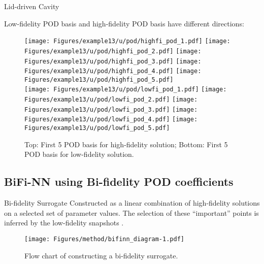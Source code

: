 \documentclass[10pt]{beamer}
\begin{document}
\begin{frame}{Lid-driven Cavity}

Low-fidelity POD basis and high-fidelity POD basis have different directions:

\begin{figure}
\centering
\vbox{
	\texttt{[image: Figures/example13/u/pod/highfi\_pod\_1.pdf]}
	\texttt{[image: Figures/example13/u/pod/highfi\_pod\_2.pdf]}
	\texttt{[image: Figures/example13/u/pod/highfi\_pod\_3.pdf]}
	\texttt{[image: Figures/example13/u/pod/highfi\_pod\_4.pdf]}
	\texttt{[image: Figures/example13/u/pod/highfi\_pod\_5.pdf]}
	\\
	\texttt{[image: Figures/example13/u/pod/lowfi\_pod\_1.pdf]}
	\texttt{[image: Figures/example13/u/pod/lowfi\_pod\_2.pdf]}
	\texttt{[image: Figures/example13/u/pod/lowfi\_pod\_3.pdf]}
	\texttt{[image: Figures/example13/u/pod/lowfi\_pod\_4.pdf]}
	\texttt{[image: Figures/example13/u/pod/lowfi\_pod\_5.pdf]}
}
\caption{Top: First 5 POD basis for high-fidelity solution; Bottom: First 5 POD basis for low-fidelity solution.}
\end{figure}

\end{frame}

\subsection{BiFi-NN using Bi-fidelity POD coefficients}

\begin{frame}{Bi-fidelity Surrogate}
Constructed as a linear combination of high-fidelity solutions on a selected set of parameter values. The selection of these ``important'' points is inferred by the low-fidelity snapshots \cite{zhu2014computational}.

\begin{figure}
\centering
\texttt{[image: Figures/method/bifinn\_diagram-1.pdf]}
\caption{Flow chart of constructing a bi-fidelity surrogate.}
\label{BiFiNN-structure}
\end{figure}

\end{frame}
\end{document}
